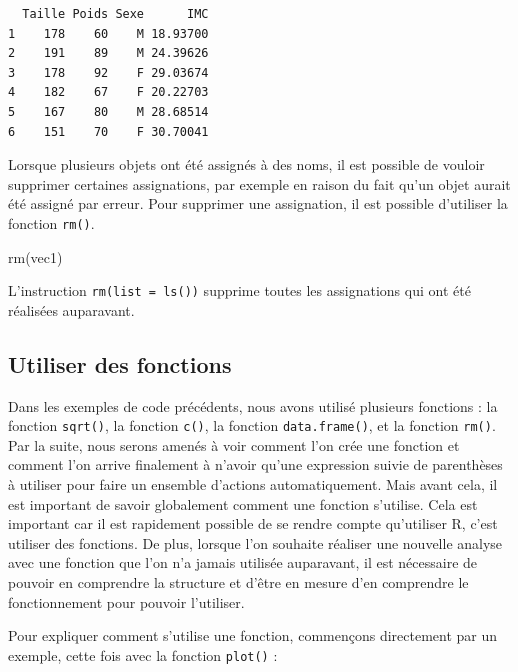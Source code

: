 \documentclass[
  letterpaper,
]{book}
\newenvironment{Shaded}{\begin{snugshade}}{\end{snugshade}}
\newcommand{\AttributeTok}[1]{\textcolor[rgb]{0.40,0.45,0.13}{#1}}
\newcommand{\FunctionTok}[1]{\textcolor[rgb]{0.28,0.35,0.67}{#1}}
\newcommand{\NormalTok}[1]{\textcolor[rgb]{0.00,0.23,0.31}{#1}}
\newcommand{\SpecialCharTok}[1]{\textcolor[rgb]{0.37,0.37,0.37}{#1}}
\begin{document}
\begin{verbatim}
  Taille Poids Sexe      IMC
1    178    60    M 18.93700
2    191    89    M 24.39626
3    178    92    F 29.03674
4    182    67    F 20.22703
5    167    80    M 28.68514
6    151    70    F 30.70041
\end{verbatim}

Lorsque plusieurs objets ont été assignés à des noms, il est possible de
vouloir supprimer certaines assignations, par exemple en raison du fait
qu'un objet aurait été assigné par erreur. Pour supprimer une
assignation, il est possible d'utiliser la fonction \texttt{rm()}.

\begin{Shaded}
\begin{Highlighting}[]
\FunctionTok{rm}\NormalTok{(vec1)}
\end{Highlighting}
\end{Shaded}

L'instruction \texttt{rm(list\ =\ ls())} supprime toutes les
assignations qui ont été réalisées auparavant.

\subsection{Utiliser des fonctions}\label{utiliser-des-fonctions}

Dans les exemples de code précédents, nous avons utilisé plusieurs
fonctions : la fonction \texttt{sqrt()}, la fonction \texttt{c()}, la
fonction \texttt{data.frame()}, et la fonction \texttt{rm()}. Par la
suite, nous serons amenés à voir comment l'on crée une fonction et
comment l'on arrive finalement à n'avoir qu'une expression suivie de
parenthèses à utiliser pour faire un ensemble d'actions automatiquement.
Mais avant cela, il est important de savoir globalement comment une
fonction s'utilise. Cela est important car il est rapidement possible de
se rendre compte qu'utiliser R, c'est utiliser des fonctions. De plus,
lorsque l'on souhaite réaliser une nouvelle analyse avec une fonction
que l'on n'a jamais utilisée auparavant, il est nécessaire de pouvoir en
comprendre la structure et d'être en mesure d'en comprendre le
fonctionnement pour pouvoir l'utiliser.

Pour expliquer comment s'utilise une fonction, commençons directement
par un exemple, cette fois avec la fonction \texttt{plot()} :

\begin{Shaded}
\end{Shaded}
\end{document}
